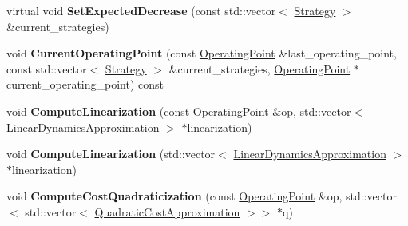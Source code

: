 \begin{DoxyCompactItemize}
\item 
virtual void {\bfseries Set\+Expected\+Decrease} (const std\+::vector$<$ \hyperlink{structilqgames_1_1_strategy}{Strategy} $>$ \&current\+\_\+strategies)\hypertarget{classilqgames_1_1_i_l_q_solver_a9c2be65e67cdbeaa908655af49e28a6e}{}\label{classilqgames_1_1_i_l_q_solver_a9c2be65e67cdbeaa908655af49e28a6e}

\item 
void {\bfseries Current\+Operating\+Point} (const \hyperlink{structilqgames_1_1_operating_point}{Operating\+Point} \&last\+\_\+operating\+\_\+point, const std\+::vector$<$ \hyperlink{structilqgames_1_1_strategy}{Strategy} $>$ \&current\+\_\+strategies, \hyperlink{structilqgames_1_1_operating_point}{Operating\+Point} $\ast$current\+\_\+operating\+\_\+point) const \hypertarget{classilqgames_1_1_i_l_q_solver_ae0145c002de655fd2b012d2142cacb6a}{}\label{classilqgames_1_1_i_l_q_solver_ae0145c002de655fd2b012d2142cacb6a}

\item 
void {\bfseries Compute\+Linearization} (const \hyperlink{structilqgames_1_1_operating_point}{Operating\+Point} \&op, std\+::vector$<$ \hyperlink{structilqgames_1_1_linear_dynamics_approximation}{Linear\+Dynamics\+Approximation} $>$ $\ast$linearization)\hypertarget{classilqgames_1_1_i_l_q_solver_a36c9160e4d5503b5160d04c0acd842d5}{}\label{classilqgames_1_1_i_l_q_solver_a36c9160e4d5503b5160d04c0acd842d5}

\item 
void {\bfseries Compute\+Linearization} (std\+::vector$<$ \hyperlink{structilqgames_1_1_linear_dynamics_approximation}{Linear\+Dynamics\+Approximation} $>$ $\ast$linearization)\hypertarget{classilqgames_1_1_i_l_q_solver_a28112eeff11ad20d5e5ead00bb61d80c}{}\label{classilqgames_1_1_i_l_q_solver_a28112eeff11ad20d5e5ead00bb61d80c}

\item 
void {\bfseries Compute\+Cost\+Quadraticization} (const \hyperlink{structilqgames_1_1_operating_point}{Operating\+Point} \&op, std\+::vector$<$ std\+::vector$<$ \hyperlink{structilqgames_1_1_quadratic_cost_approximation}{Quadratic\+Cost\+Approximation} $>$$>$ $\ast$q)\hypertarget{classilqgames_1_1_i_l_q_solver_a54d6c9c2afc1164cbcbc6b2eec7d2086}{}\label{classilqgames_1_1_i_l_q_solver_a54d6c9c2afc1164cbcbc6b2eec7d2086}

\end{DoxyCompactItemize}

